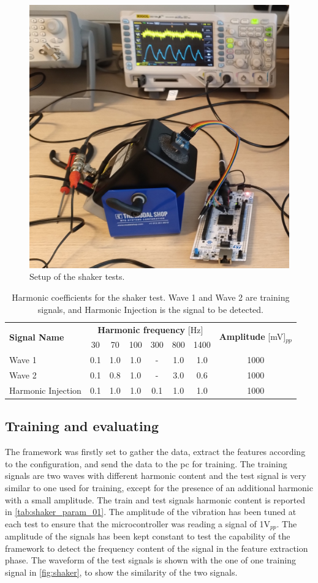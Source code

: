 \begin{figure}
    \centering
    \includegraphics[width=.4\textwidth]{Images/shaker/IMG_20231207_103126143.jpg}
    \caption{Setup of the shaker tests.}
    \label{fig:shaker_setup}
\end{figure}
\begin{table}
    \centering
    \caption{Harmonic coefficients for the shaker test. Wave 1 and Wave 2 are training signals, and Harmonic Injection is the signal to be detected.}
    \label{tab:shaker_param_01}
    \begin{tabular}{lccccccc} 
    \toprule
    \multirow{2}{*}{\textbf{Signal Name }} & \multicolumn{6}{c}{\textbf{Harmonic frequency} [Hz]} & \multirow{2}{*}{\textbf{Amplitude} [mV]$_{pp}$} \\
     & 30 & 70 & 100 & 300 & 800 & 1400 &  \\ 
    \hline
    Wave 1 & 0.1 & 1.0 & 1.0 & \multicolumn{1}{c}{-} & 1.0 & 1.0 & 1000 \\
    Wave 2 & 0.1 & 0.8 & 1.0 & \multicolumn{1}{c}{-} & 3.0 & 0.6 & 1000 \\
    Harmonic Injection & 0.1 & 1.0 & 1.0 & 0.1 & 1.0 & 1.0 & 1000 \\
    \bottomrule
    \end{tabular}
    \end{table}

\subsection{Training and evaluating}
The framework was firstly set to gather the data, extract the features according to the configuration, and send the data to the \gls{pc} for training. The training signals are two waves with different harmonic content and the test signal is very similar to one used for training, except for the presence of an additional harmonic with a small amplitude. The train and test signals harmonic content is reported in \autoref{tab:shaker_param_01}. The amplitude of the vibration has been tuned at each test to ensure that the microcontroller was reading a signal of 1V$_{pp}$. The amplitude of the signals has been kept constant to test the capability of the framework to detect the frequency content of the signal in the feature extraction phase. The waveform of the test signals is shown with the one of one training signal in \autoref{fig:shaker}, to show the similarity of the two signals. 

